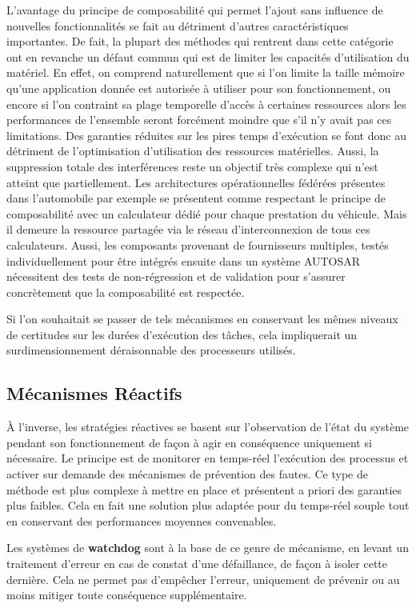 \documentclass[french, a4paper, 11pt, twoside, pdftex]{StyleThese}
\begin{document}
		L'avantage du principe de composabilité qui permet l'ajout sans influence de nouvelles fonctionnalités se fait au détriment d'autres caractéristiques importantes. De fait, la plupart des méthodes qui rentrent dans cette catégorie ont en revanche un défaut commun qui est de limiter les capacités d'utilisation du matériel. En effet, on comprend naturellement que si l'on limite la taille mémoire qu'une application donnée est autorisée à utiliser pour son fonctionnement, ou encore si l'on contraint sa plage temporelle d'accès à certaines ressources alors les performances de l'ensemble seront forcément moindre que s'il n'y avait pas ces limitations. Des garanties réduites sur les pires temps d'exécution se font donc au détriment de l'optimisation d'utilisation des ressources matérielles. Aussi, la suppression totale des interférences reste un objectif très complexe qui n'est atteint que partiellement. Les architectures opérationnelles fédérées présentes dans l'automobile par exemple se présentent comme respectant le principe de composabilité avec un calculateur dédié pour chaque prestation du véhicule. Mais il demeure la ressource partagée via le réseau d'interconnexion de tous ces calculateurs. Aussi, les composants provenant de fournisseurs multiples, testés individuellement pour être intégrés ensuite dans un système AUTOSAR nécessitent des tests de non-régression et de validation pour s'assurer concrètement que la composabilité est respectée.
		
		Si l'on souhaitait se passer de tels mécanismes en conservant les mêmes niveaux de certitudes sur les durées d'exécution des tâches, cela impliquerait un surdimensionnement déraisonnable des processeurs utilisés. 

	\subsection{Mécanismes Réactifs}
		À l'inverse, les stratégies réactives se basent sur l'observation de l'état du système pendant son fonctionnement de façon à agir en conséquence uniquement si nécessaire. Le principe est de monitorer en temps-réel l'exécution des processus et activer sur demande des mécanismes de prévention des fautes. Ce type de méthode est plus complexe à mettre en place et présentent a priori des garanties plus faibles. Cela en fait une solution plus adaptée pour du temps-réel souple tout en conservant des performances moyennes convenables. 
		
		Les systèmes de \textbf{watchdog} sont à la base de ce genre de mécanisme, en levant un traitement d'erreur en cas de constat d'une défaillance, de façon à isoler cette dernière. Cela ne permet pas d'empêcher l'erreur, uniquement de prévenir ou au moins mitiger  toute conséquence supplémentaire.
		
\end{document}
